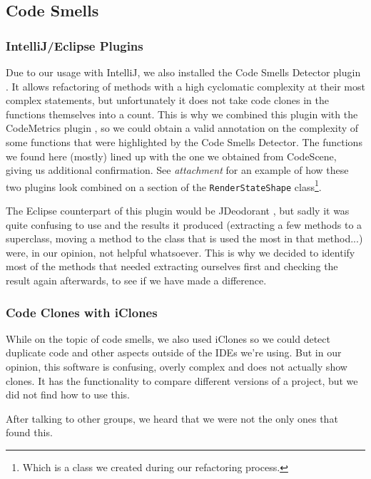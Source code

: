 \documentclass[11pt]{article}
\begin{document}
	\subsection{Code Smells}
	\subsubsection{IntelliJ/Eclipse Plugins}	
	Due to our usage with \textsf{IntelliJ}, we also installed the \textsf{Code Smells Detector} plugin \cite{jetbrains-csd}. It allows refactoring of methods with a high cyclomatic complexity at their most complex statements, but unfortunately it does not take code clones in the functions themselves into a count. This is why we combined this plugin with the \textsf{CodeMetrics} plugin \cite{jetbrains-cm}, so we could obtain a valid annotation on the complexity of some functions that were highlighted by the \textsf{Code Smells Detector}. The functions we found here (mostly) lined up with the one we obtained from \textsf{CodeScene}, giving us additional confirmation. See \textsl{attachment \pageref{intellij-plugins}} for an example of how these two plugins look combined on a section of the \texttt{RenderStateShape} class\footnote{Which is a class we created during our refactoring process.}.
	
	The \textsf{Eclipse} counterpart of this plugin would be \textsf{JDeodorant} \cite{jdeodorant}, but sadly it was quite confusing to use and the results it produced (extracting a few methods to a superclass, moving a method to the class that is used the most in that method...) were, in our opinion, not helpful whatsoever. This is why we decided to identify most of the methods that needed extracting ourselves first and checking the result again afterwards, to see if we have made a difference.
	
	\subsubsection{Code Clones with iClones}
	While on the topic of code smells, we also used \textsf{iClones} so we could detect duplicate code and other aspects outside of the IDEs we're using. But in our opinion, this software is confusing, overly complex and does not actually show clones. It has the functionality to compare different versions of a project, but we did not find how to use this.
	
	After talking to other groups, we heard that we were not the only ones that found this.
	
\end{document}
